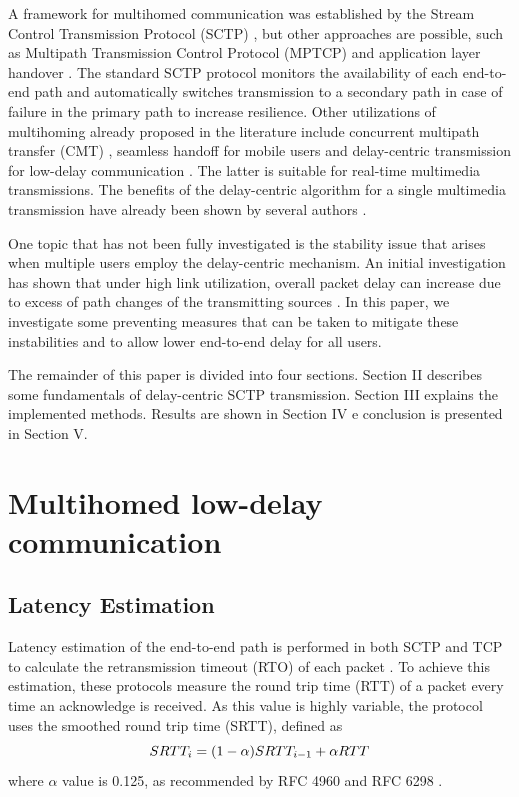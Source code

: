 \documentclass{sbrt2015}
\begin{document}
A framework for multihomed communication was established by the Stream Control Transmission Protocol (SCTP) \cite{Stewart2007a}, but other approaches are possible, such as Multipath Transmission Control Protocol (MPTCP) \cite{Ford2013}\cite{Zekri2012} and application layer handover \cite{Cunningham2004}. The standard SCTP protocol monitors the availability of each end-to-end path and automatically switches transmission to a secondary path in case of failure in the primary path to increase resilience. Other utilizations of multihoming already proposed in the literature include concurrent multipath transfer (CMT) \cite{Casetti2004}\cite{Ye2004}\cite{Iyengar2006}, seamless handoff for mobile users \cite{Koh2004}\cite{Ma2004} and delay-centric transmission for low-delay communication \cite{Kelly2004}\cite{Kashihara2004}. The latter is suitable for real-time multimedia transmissions.
The benefits of the delay-centric algorithm for a single multimedia transmission have already been shown by several authors \cite{Noonan2004b}\cite{Fitzpatrick2007}\cite{Gavriloff2009a}\cite{Runcos2010}. 

One topic that has not been fully investigated is the stability issue that arises when multiple users employ the delay-centric mechanism. An initial investigation has shown that under high link utilization, overall packet delay can increase due to excess of path changes of the transmitting sources \cite{Gavriloff2009}.
In this paper, we investigate some preventing measures that can be taken to mitigate these instabilities and to allow lower end-to-end delay for all users.

The remainder of this paper is divided into four sections. Section II describes some fundamentals of delay-centric SCTP transmission. Section III explains the implemented methods. Results are shown in Section IV e conclusion is presented in Section V.  

  \section{Multihomed low-delay communication}
  
  \subsection{Latency Estimation}

  Latency estimation of the end-to-end path is performed in both SCTP and TCP to calculate the retransmission timeout (RTO) of each packet \cite{Stewart2007a}\cite{Postel1981}. To achieve this estimation, these protocols measure the round trip time (RTT) of a packet every time an acknowledge is received. As this value is highly variable, the protocol uses the smoothed round trip time (SRTT), defined as
\begin{equation}
SRTT_i  = (1 - \alpha) SRTT_{i-1} + \alpha  RTT \\
\end{equation}
\noindent where $\alpha$ value is 0.125, as recommended by RFC 4960 \cite{Stewart2007a} and RFC 6298 \cite{Paxson2011}.
\end{document}
